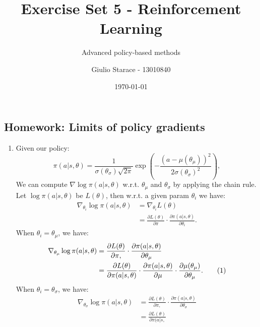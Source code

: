 \documentclass{article}
\title{Exercise Set 5 - Reinforcement Learning}
\subtitle{Advanced policy-based methods}
\author{Giulio Starace - 13010840}
\date{\today}
\newcommand\numberthis{\addtocounter{equation}{1}\tag{\theequation}}
\begin{document}
\maketitle
\setcounter{section}{9}
\setcounter{subsection}{3}
\subsection{Homework: Limits of policy gradients}
\begin{enumerate}
	\item Given our policy:
	      \begin{equation}
		      \pi(a|s, \theta)=\frac{1}{\sigma\left(\theta_\sigma\right) \sqrt{2 \pi}} \exp
		      \left(-\frac{\left(a-\mu\left(\theta_\mu\right)\right)^2}{2
				      \sigma\left(\theta_\sigma\right)^2}\right),
	      \end{equation}
	      We can compute $\nabla \log \pi(a|s, \theta)$ w.r.t. $\theta_\mu$ and $\theta_\sigma$ by
	      applying the chain rule. Let $\log \pi(a|s, \theta)$ be $L(\theta)$, then w.r.t. a given
	      param $\theta_i$ we have:
	      \begin{align*}
		      \nabla_{\theta_i} \log \pi(a|s, \theta) & = \nabla_{\theta_i} L(\theta)                   \\
		                                              & = \frac{\partial L(\theta)}{\partial \pi} \cdot
		      \frac{\partial \pi(a|s,\theta)}{\partial \theta_i}.
	      \end{align*}
	      When $\theta_i = \theta_\mu$, we have:
	      \begin{align*}
		      \nabla_{\theta_\mu} \log \pi(a|s, \theta) & = \frac{\partial L(\theta)}{\partial \pi,
		      } \cdot \frac{\partial \pi(a|s,\theta)}{\partial \theta_\mu}                               \\
		                                                & =  \frac{\partial L(\theta)}{\partial \pi(a|s,
			      \theta)} \cdot \frac{\partial \pi(a|s,\theta)}{\partial \mu} \cdot
		      \frac{\partial{\mu(\theta_\mu)}}{\partial \theta_\mu}. \numberthis \label{eq:grad_mu}
	      \end{align*}
	      When $\theta_i = \theta_\sigma$, we have:
	      \begin{align*}
		      \nabla_{\theta_\sigma} \log \pi(a|s, \theta) & = \frac{\partial L(\theta)}{\partial \pi,
		      } \cdot \frac{\partial \pi(a|s,\theta)}{\partial \theta_\sigma}                               \\
		                                                   & =  \frac{\partial L(\theta)}{\partial \pi(a|s,
}
\end{align*}
\end{enumerate}
\end{document}
